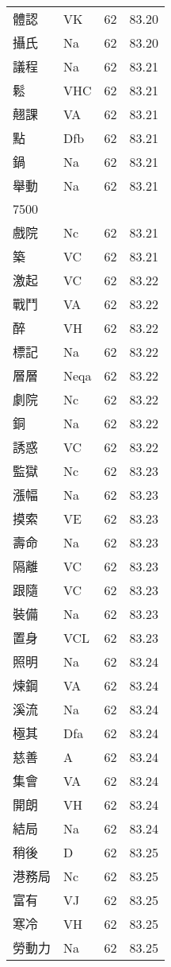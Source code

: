 \documentclass[twocolumn]{book}
\begin{document}
\begin{supertabular}{llrr}
體認 & VK & 62 &  83.20\\
攝氏 & Na & 62 &  83.20\\
議程 & Na & 62 &  83.21\\
鬆 & VHC & 62 &  83.21\\
翹課 & VA & 62 &  83.21\\
點 & Dfb & 62 &  83.21\\
鍋 & Na & 62 &  83.21\\
舉動 & Na & 62 &  83.21\\
7500\\
戲院 & Nc & 62 &  83.21\\
築 & VC & 62 &  83.21\\
激起 & VC & 62 &  83.22\\
戰鬥 & VA & 62 &  83.22\\
醉 & VH & 62 &  83.22\\
標記 & Na & 62 &  83.22\\
層層 & Neqa & 62 &  83.22\\
劇院 & Nc & 62 &  83.22\\
銅 & Na & 62 &  83.22\\
誘惑 & VC & 62 &  83.22\\
監獄 & Nc & 62 &  83.23\\
漲幅 & Na & 62 &  83.23\\
摸索 & VE & 62 &  83.23\\
壽命 & Na & 62 &  83.23\\
隔離 & VC & 62 &  83.23\\
跟隨 & VC & 62 &  83.23\\
裝備 & Na & 62 &  83.23\\
置身 & VCL & 62 &  83.23\\
照明 & Na & 62 &  83.24\\
煉鋼 & VA & 62 &  83.24\\
溪流 & Na & 62 &  83.24\\
極其 & Dfa & 62 &  83.24\\
慈善 & A & 62 &  83.24\\
集會 & VA & 62 &  83.24\\
開朗 & VH & 62 &  83.24\\
結局 & Na & 62 &  83.24\\
稍後 & D & 62 &  83.25\\
港務局 & Nc & 62 &  83.25\\
富有 & VJ & 62 &  83.25\\
寒冷 & VH & 62 &  83.25\\
勞動力 & Na & 62 &  83.25\\

\end{supertabular}
\end{document}

